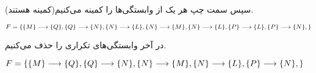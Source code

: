 \documentclass{article}
\begin{document}
سپس سمت چپ هر یک از وابستگی‌ها را کمینه می‌کنیم(کمینه هستند).
\begin{latin}
$
\\F=\\
\{\\
	\{M\}\longrightarrow\{Q\},\\
	\{Q\}\longrightarrow\{N\},\\
	\{N\}\longrightarrow\{L\},\\
	\{N\}\longrightarrow\{M\},\\
	\{N\}\longrightarrow\{L\},\\
	\{P\}\longrightarrow\{L\},\\
	\{P\}\longrightarrow\{N\},\\
\}
$
\end{latin}

در آخر وابستگی‌های تکراری را حذف می‌کنیم.
\begin{latin}
$
\\F=\\
\{\\
	\{M\}\longrightarrow\{Q\},\\
	\{Q\}\longrightarrow\{N\},\\
	\{N\}\longrightarrow\{M\},\\
	\{N\}\longrightarrow\{L\},\\
	\{P\}\longrightarrow\{N\},\\
\}
$
\end{latin}
\end{document}
